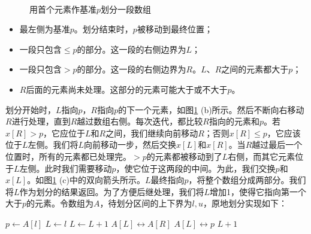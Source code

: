 \documentclass[b5paper]{ctexart}
\begin{document}
\begin{figure}[htbp]
{} \\
   \caption{用首个元素作基准$p$划分一段数组}
   \label{fig:partition-1-way}
\end{figure}

\begin{itemize}
\item 最左侧为基准$p$。划分结束时，$p$被移动到最终位置；
\item 一段只包含$\leq p$的部分。这一段的右侧边界为$L$；
\item 一段只包含$> p$的部分。这一段的右侧边界为$R$。$L$、$R$之间的元素都大于$p$；
\item $R$后面的元素尚未处理。这部分的元素可能大于或不大于$p$。
\end{itemize}

划分开始时，$L$指向$p$，$R$指向$p$的下一个元素，如图\ref{fig:partition-1-way} (b)所示。然后不断向右移动$R$进行处理，直到$R$越过数组右侧。每次迭代，都比较$R$指向的元素和$p$。若$x[R] > p$，它应位于$L$和$R$之间，我们继续向前移动$R$；否则$x[R] \leq p$，它应该位于$L$左侧。我们将$L$向前移动一步，然后交换$x[L]$和$x[R]$。当$R$越过最后一个位置时，所有的元素都已处理完。$> p$的元素都被移动到了$L$右侧，而其它元素位于$L$左侧。此时我们需要移动$p$，使它位于这两段的中间。为此，我们交换$p$和$x[L]$。如图\ref{fig:partition-1-way} (c)中的双向箭头所示。$L$最终指向$p$，将整个数组分成两部分。我们将$L$作为划分的结果返回。为了方便后继处理，我们将$L$增加1，使得它指向第一个大于$p$的元素。令数组为$A$，待划分区间的上下界为$l, u$，原地划分实现如下：

\begin{algorithmic}[1]
  \State $p \gets A[l]$  
  \State $L \gets l$ 
   
      \State $L \gets L + 1$
      \State {} $A[L] \leftrightarrow A[R]$
    \EndIf
  \EndFor
  \State {} $A[L] \leftrightarrow p$
  \State \Return $L + 1$ 
\EndFunction
\end{algorithmic}
\end{document}
